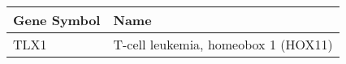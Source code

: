 \begin{tabular}{ll}
\toprule
Gene Symbol &                                Name \\
\midrule
       TLX1 & T-cell leukemia, homeobox 1 (HOX11) \\
\bottomrule
\end{tabular}
